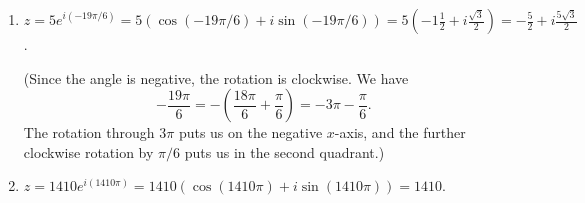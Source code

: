 \documentclass[12pt]{article}
\begin{document}
\begin{enumerate}
\begin{enumerate}
 \item $z=5e^{i(-19\pi/6)}=5(\cos(-19\pi/6)+i\sin(-19\pi/6))= 5\left(-1\frac12+i\frac{\sqrt{3}}{2}\right)=-\frac{5}{2}+i\frac{5\sqrt{3}}{2}$.
 
(Since the angle is negative, the rotation is clockwise. We have
\[
-\frac{19\pi}{6} = -\left(\frac{18\pi}{6}+\frac{\pi}{6}\right)=-3\pi-\frac{\pi}{6}.
\]
The rotation through $3\pi$ puts us on the negative $x$-axis, and the further clockwise rotation by $\pi/6$ puts us in the second quadrant.)

  \item $z=1410e^{i(1410\pi) }=1410(\cos(1410\pi)+i\sin(1410\pi))=1410.$
\end{enumerate}

\end{enumerate}
\end{document}
